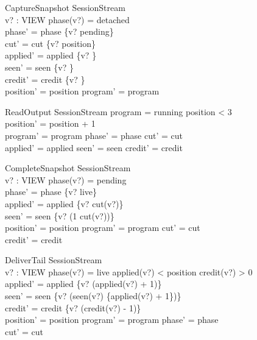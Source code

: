 \documentclass[a4paper,10pt]{article}
\begin{document}
\begin{schema}{CaptureSnapshot}
\Delta SessionStream \\
v? : VIEW
\where
phase(v?) = detached \\
phase' = phase \oplus \{v? \mapsto pending\} \\
cut' = cut \oplus \{v? \mapsto position\} \\
applied' = applied \oplus \{v? \} \\
seen' = seen \oplus \{v? \mapsto \emptyset\} \\
credit' = credit \oplus \{v? \} \\
position' = position \land program' = program
\end{schema}

\begin{schema}{ReadOutput}
\Delta SessionStream
\where
program = running \land position < 3 \\
position' = position + 1 \\
program' = program \land phase' = phase \land cut' = cut \\
applied' = applied \land seen' = seen \land credit' = credit
\end{schema}

\begin{schema}{CompleteSnapshot}
\Delta SessionStream \\
v? : VIEW
\where
phase(v?) = pending \\
phase' = phase \oplus \{v? \mapsto live\} \\
applied' = applied \oplus \{v? \mapsto cut(v?)\} \\
seen' = seen \oplus \{v? \mapsto (1 \upto cut(v?))\} \\
position' = position \land program' = program \land cut' = cut \\
credit' = credit
\end{schema}

\begin{schema}{DeliverTail}
\Delta SessionStream \\
v? : VIEW
\where
phase(v?) = live \land applied(v?) < position \land credit(v?) > 0 \\
applied' = applied \oplus \{v? \mapsto (applied(v?) + 1)\} \\
seen' = seen \oplus \{v? \mapsto (seen(v?) \cup \{applied(v?) + 1\})\} \\
credit' = credit \oplus \{v? \mapsto (credit(v?) - 1)\} \\
position' = position \land program' = program \land phase' = phase \\
cut' = cut
\end{schema}
\end{document}
